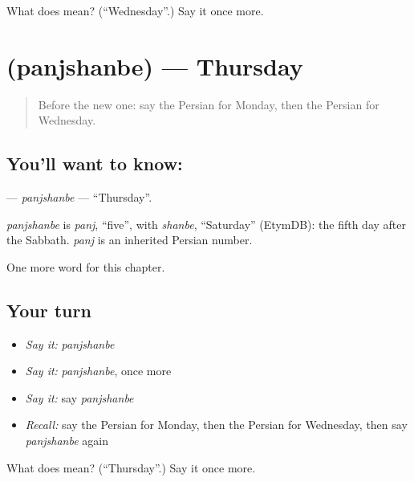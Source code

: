 \begin{tcolorbox}[breakable,colback=teal!4,colframe=teal!35!black,title={Before you move on}]
What does  mean? (\textquotedblleft{}Wednesday\textquotedblright{}.) Say it once more.
\end{tcolorbox}
\section[\texorpdfstring{\fa{پنجشنبه} (panjshanbe)}{پنجشنبه (panjshanbe)}]{ (panjshanbe) — Thursday}

\label{lesson:FA-C81-panjshanbe}



\begin{quote}
Before the new one: say the Persian for Monday, then the Persian for Wednesday.
\end{quote}

\subsection*{You'll want to know: }
\textbf{} — \emph{panjshanbe} — \textquotedblleft{}Thursday\textquotedblright{}.

\begin{cousinweb}
\emph{panjshanbe} is \emph{panj}, \textquotedblleft{}five\textquotedblright{}, with \emph{shanbe}, \textquotedblleft{}Saturday\textquotedblright{} (EtymDB): the fifth day after the Sabbath. \emph{panj} is an inherited Persian number.
\end{cousinweb}

\begin{grammarlens}[title={What you've built}]
One more word for this chapter.
\end{grammarlens}

\subsection*{Your turn}
\begin{itemize}
\raggedright
  \item \emph{Say it:} \emph{panjshanbe}
  \item \emph{Say it:} \emph{panjshanbe}, once more
  \item \emph{Say it:} say \emph{panjshanbe}
  \item \emph{Recall:} say the Persian for Monday, then the Persian for Wednesday, then say \emph{panjshanbe} again
\end{itemize}

\begin{tcolorbox}[breakable,colback=teal!4,colframe=teal!35!black,title={Before you move on}]
What does  mean? (\textquotedblleft{}Thursday\textquotedblright{}.) Say it once more.
\end{tcolorbox}

